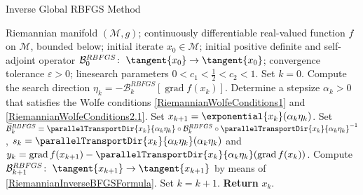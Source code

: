 \begin{algorithm}[H]
    \caption{Inverse Global RBFGS Method}\label{InverseGlobalRiemannianBFGS-Method}
    \begin{algorithmic}[1]
        \State Riemannian manifold $(\mathcal{M}, g)$; continuously differentiable real-valued function $f$ on $\mathcal{M}$, bounded below; initial iterate $x_0 \in \mathcal{M}$; initial positive definite and self-adjoint operator $\mathcal{B}^{RBFGS}_0 \colon \; \tangent{x_0} \to \tangent{x_0}$; convergence tolerance $\varepsilon > 0$; linesearch parameters $0 < c_1 < \frac{1}{2} < c_2 < 1$. Set $k = 0$.
            \State Compute the search direction $\eta_k = - \mathcal{B}^{RBFGS}_k [\operatorname{grad} f(x_k)]$.
            \State Determine a stepsize $\alpha_k > 0$ that satisfies the Wolfe conditions \cref{RiemannianWolfeConditions1} and \cref{RiemannianWolfeConditions2.1}. 
            \State Set $x_{k+1} = \exponential{x_k} (\alpha_k \eta_k)$.
            \State Set $\widetilde{\mathcal{B}}^{RBFGS}_k = \parallelTransportDir{x_k}{\alpha_k \eta_k} \circ \mathcal{B}^{RBFGS}_k \circ {\parallelTransportDir{x_k}{\alpha_k \eta_k}}^{-1}$, $s_k = \parallelTransportDir{x_k}{\alpha_k \eta_k} (\alpha_k \eta_k)$ and 
            \StatexIndent[2] $y_k = \operatorname{grad} f(x_{k+1}) - \parallelTransportDir{x_k}{\alpha_k \eta_k} (\operatorname{grad} f(x_k))$.
            \State Compute $\mathcal{B}^{RBFGS}_{k+1} \colon \; \tangent{x_{k+1}} \to \tangent{x_{k+1}}$ by means of \cref{RiemannianInverseBFGSFormula}. 
            \State Set $k = k+1$.
        \EndWhile
        \State \textbf{Return} $x_k$.
    \end{algorithmic}
\end{algorithm}

